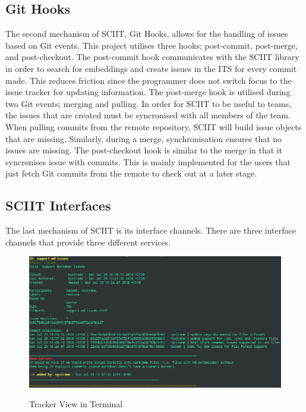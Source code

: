 \documentclass{mproj}
\begin{document}
\subsection{Git Hooks}

The second mechanism of SCIIT, Git Hooks, allows for the handling of issues based on Git events. This project utilises three hooks; post-commit, post-merge, and post-checkout. The post-commit hook communicates with the SCIIT library in order to search for embeddings and create issues in the ITS for every commit made. This reduces friction since the programmer does not switch focus to the issue tracker for updating information. The post-merge hook is utilised during two Git events; merging and pulling. In order for SCIIT to be useful to teams, the issues that are created must be syncronised with all members of the team. When pulling commits from the remote repository, SCIIT will build issue objects that are missing. Similarly, during a merge, synchronisation ensures that no issues are missing. The post-checkout hook is similar to the merge in that it syncronises issue with commits. This is mainly implemented for the users that just fetch Git commits from the remote to check out at a later stage.

\subsection{SCIIT Interfaces}

The last mechanism of SCIIT is its interface channels. There are three interface channels that provide three different services.

\begin{figure}
\centering
  \caption{Tracker View in Terminal}
  \includegraphics[width=15cm]{sciit-tracker-shot}
  \label{fig:sciit-tracker-shot}
\end{figure}
\end{document}

